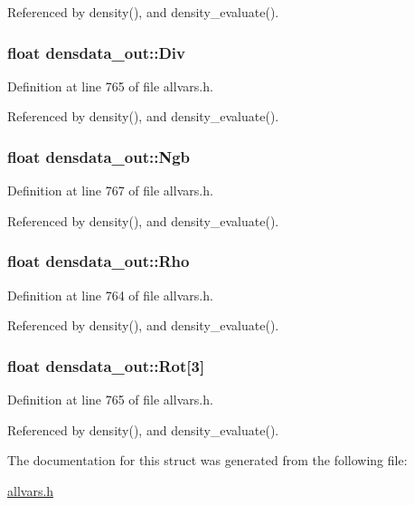 Referenced by density(), and density\_\-evaluate().

\hypertarget{structdensdata__out_af3c2ce61474da5764ac1b50155c0aa7e}{
\subsubsection[{Div}]{\setlength{\rightskip}{0pt plus 5cm}float {\bf densdata\_\-out::Div}}}
\label{structdensdata__out_af3c2ce61474da5764ac1b50155c0aa7e}


Definition at line 765 of file allvars.h.



Referenced by density(), and density\_\-evaluate().

\hypertarget{structdensdata__out_ad78ddc3f9c8fb77b2e98f04d5cd2dfb4}{
\subsubsection[{Ngb}]{\setlength{\rightskip}{0pt plus 5cm}float {\bf densdata\_\-out::Ngb}}}
\label{structdensdata__out_ad78ddc3f9c8fb77b2e98f04d5cd2dfb4}


Definition at line 767 of file allvars.h.



Referenced by density(), and density\_\-evaluate().

\hypertarget{structdensdata__out_a7a4edc5de1283464a658fb089594d11c}{
\subsubsection[{Rho}]{\setlength{\rightskip}{0pt plus 5cm}float {\bf densdata\_\-out::Rho}}}
\label{structdensdata__out_a7a4edc5de1283464a658fb089594d11c}


Definition at line 764 of file allvars.h.



Referenced by density(), and density\_\-evaluate().

\hypertarget{structdensdata__out_a748be7d0e50757980389fb667d6d022b}{
\subsubsection[{Rot}]{\setlength{\rightskip}{0pt plus 5cm}float {\bf densdata\_\-out::Rot}\mbox{[}3\mbox{]}}}
\label{structdensdata__out_a748be7d0e50757980389fb667d6d022b}


Definition at line 765 of file allvars.h.



Referenced by density(), and density\_\-evaluate().



The documentation for this struct was generated from the following file:\begin{DoxyCompactItemize}
\item 
\hyperlink{allvars_8h}{allvars.h}\end{DoxyCompactItemize}

